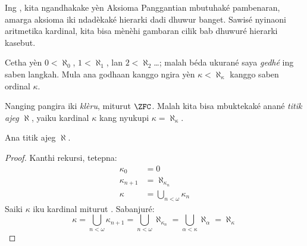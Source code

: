 \documentclass[../../../include/open-logic-section]{subfiles}
\begin{document}

Ing , kita ngandhakake yèn Aksioma Panggantian
mbutuhaké pambenaran, amarga aksioma iki ndadèkaké hierarki
dadi dhuwur banget. Sawisé nyinaoni aritmetika kardinal, kita bisa
mènèhi gambaran cilik bab dhuwuré hierarki kasebut.

Cetha yèn $0 < \aleph_0$, $1 < \aleph_1$, lan $2 < \aleph_2$\ldots;
malah béda ukurané saya \emph{gedhé} ing saben langkah. Mula ana
godhaan kanggo ngira yèn $\kappa< \aleph_\kappa$ kanggo saben
ordinal $\kappa$.

Nanging pangira iki \emph{klèru}, miturut $\ZFC$. Malah kita bisa
mbuktekaké anané \emph{titik ajeg $\aleph$}, yaiku kardinal
$\kappa$ kang nyukupi $\kappa=\aleph_\kappa$.

\begin{prop}
Ana titik ajeg $\aleph$.
\end{prop}

\begin{proof}
Kanthi rekursi, tetepna:
\begin{align*}
	\kappa_0 &= 0\\
	\kappa_{n+1} &= \aleph_{\kappa_n}\\
	\kappa&= \bigcup_{n < \omega}\kappa_n
\end{align*}
Saiki $\kappa$ iku kardinal miturut
. Sabanjuré:
\[
	\kappa= \bigcup_{n < \omega} \kappa_{n+1} =
	\bigcup_{n < \omega}\aleph_{\kappa_n} =
	\bigcup_{\alpha < \kappa}\aleph_\alpha = \aleph_\kappa
\]
\end{proof}
\end{document}
